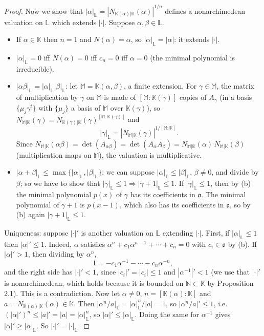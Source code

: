 \documentclass[11pt]{article}
\begin{document}
\begin{proof}
Now we show that $|\alpha|_{\mathbb{L}} = |N_{\mathbb{K}(\alpha)|\mathbb{K}}(\alpha)|^{1/n}$ defines a nonarchimedean valuation on $\mathbb{L}$ which extends $|\cdot|$. Suppose $\alpha, \beta \in \mathbb{L}$.
\begin{itemize}
\item If $\alpha \in \mathbb{K}$ then $n = 1$ and $N(\alpha) = \alpha$, so $|\alpha|_{\mathbb{L}} = |\alpha|$: it extends $|\cdot|$.
\item $|\alpha|_{\mathbb{L}} = 0$ iff $N(\alpha) = 0$ iff $c_n = 0$ iff $\alpha = 0$ (the minimal polynomial is irreducible).
\item $|\alpha\beta|_{\mathbb{L}} = |\alpha|_{\mathbb{L}} |\beta|_{\mathbb{L}}$: let $\mathbb{M} = \mathbb{K}(\alpha, \beta)$, a finite extension. For $\gamma \in \mathbb{M}$, the matrix of multiplication by $\gamma$ on $\mathbb{M}$ is made of $[\mathbb{M} : \mathbb{K}(\gamma)]$ copies of $A_\gamma$ (in a basis $\{\mu_j \gamma^i\}$ with $\{\mu_j\}$ a basis of $\mathbb{M}$ over $\mathbb{K}(\gamma)$), so $N_{\mathbb{M}|\mathbb{K}}(\gamma) = N_{\mathbb{K}(\gamma)|\mathbb{K}}(\gamma)^{[\mathbb{M} : \mathbb{K}(\gamma)]}$ and
\[
|\gamma|_{\mathbb{L}} = |N_{\mathbb{M}|\mathbb{K}}(\gamma)|^{1/[\mathbb{M} : \mathbb{K}]} .
\]
Since $N_{\mathbb{M}|\mathbb{K}}(\alpha\beta) = \det(A_{\alpha\beta}) = \det(A_\alpha A_\beta) = N_{\mathbb{M}|\mathbb{K}}(\alpha)\,N_{\mathbb{M}|\mathbb{K}}(\beta)$ (multiplication maps on $\mathbb{M}$), the valuation is multiplicative.
\item $|\alpha + \beta|_{\mathbb{L}} \leq \max\{|\alpha|_{\mathbb{L}}, |\beta|_{\mathbb{L}}\}$: we can suppose $|\alpha|_{\mathbb{L}} \leq |\beta|_{\mathbb{L}}$, $\beta \neq 0$, and divide by $\beta$; so we have to show that $|\gamma|_{\mathbb{L}} \leq 1 \Rightarrow |\gamma + 1|_{\mathbb{L}} \leq 1$. If $|\gamma|_{\mathbb{L}} \leq 1$, then by (b) the minimal polynomial $p(x)$ of $\gamma$ has its coefficients in $\mathfrak{o}$. The minimal polynomial of $\gamma + 1$ is $p(x - 1)$, which also has its coefficients in $\mathfrak{o}$, so by (b) again $|\gamma + 1|_{\mathbb{L}} \leq 1$.
\end{itemize}

Uniqueness: suppose $|\cdot|'$ is another valuation on $\mathbb{L}$ extending $|\cdot|$. First, if $|\alpha|_{\mathbb{L}} \leq 1$ then $|\alpha|' \leq 1$. Indeed, $\alpha$ satisfies $\alpha^n + c_1\alpha^{n-1} + \cdots + c_n = 0$ with $c_i \in \mathfrak{o}$ by (b). If $|\alpha|' > 1$, then dividing by $\alpha^n$,
\[
1 = -c_1\alpha^{-1} - \cdots - c_n\alpha^{-n},
\]
and the right side has $|\cdot|' < 1$, since $|c_i|' = |c_i| \leq 1$ and $|\alpha^{-1}|' < 1$ (we use that $|\cdot|'$ is nonarchimedean, which holds because it is bounded on $\mathbb{N} \subset \mathbb{K}$ by Proposition 2.1). This is a contradiction. Now let $\alpha \neq 0$, $n = [\mathbb{K}(\alpha) : \mathbb{K}]$ and $a = N_{\mathbb{K}(\alpha)|\mathbb{K}}(\alpha) \in \mathbb{K}$. Then $|\alpha^n / a|_{\mathbb{L}} = |\alpha|_{\mathbb{L}}^n / |a| = 1$, so $|\alpha^n / a|' \leq 1$, i.e.\ $(|\alpha|')^n \leq |a|' = |a| = |\alpha|_{\mathbb{L}}^n$, so $|\alpha|' \leq |\alpha|_{\mathbb{L}}$. Doing the same for $\alpha^{-1}$ gives $|\alpha|' \geq |\alpha|_{\mathbb{L}}$. So $|\cdot|' = |\cdot|_{\mathbb{L}}$.


\end{proof}
\end{document}
